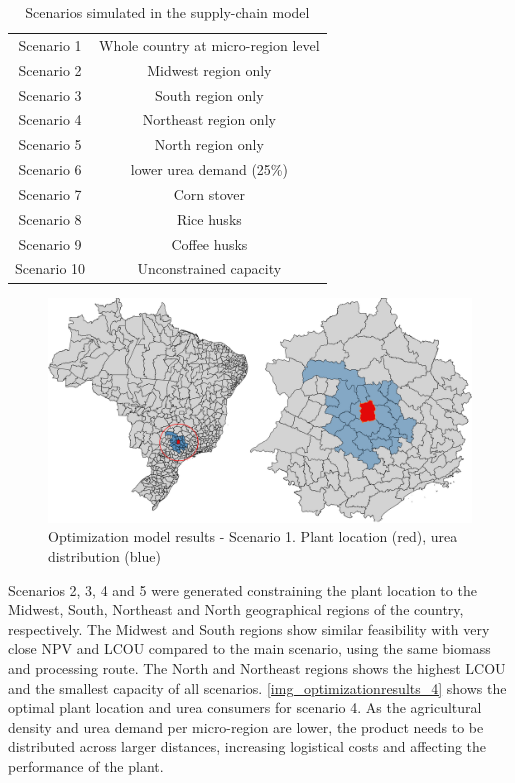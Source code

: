 \documentclass[a4paper, titlepage]{article}
\begin{document}
\begin{table}
	\centering
	\caption{Scenarios simulated in the supply-chain model}
	\label{tab_scenarios}
	\begin{tabular}{||c | c ||}
		Scenario 1 & Whole country at micro-region level \\
		Scenario 2 & Midwest region only \\
		Scenario 3 & South region only \\
		Scenario 4 & Northeast region only \\
		Scenario 5 & North region only \\ 
		Scenario 6 & lower urea demand (25\%) \\ 
		Scenario 7 & Corn stover \\ 
		Scenario 8 & Rice husks \\ 
		Scenario 9 & Coffee husks \\ 
		Scenario 10 & Unconstrained capacity \\ 

	\end{tabular}
\end{table}

\begin{figure}
	\includegraphics[width=\textwidth]{img/optimization_result_1.png}
	\caption{Optimization model results - Scenario 1. Plant location (red), urea distribution (blue)}
	\label{img_optimizationresults_1}
\end{figure}

Scenarios 2, 3, 4 and 5 were generated constraining the plant location to the Midwest, South, Northeast and North
geographical regions of the country, respectively. The Midwest and South regions show similar feasibility with very close
NPV and LCOU compared to the main scenario, using the same biomass and processing route. The North and Northeast
regions shows the highest LCOU and the smallest capacity of all scenarios. \autoref{img_optimizationresults_4} shows the optimal plant location and urea consumers for scenario 4. As the agricultural density and urea demand per micro-region are lower, the product needs to be distributed across larger distances, increasing logistical costs and affecting the performance of the plant.
\end{document}
